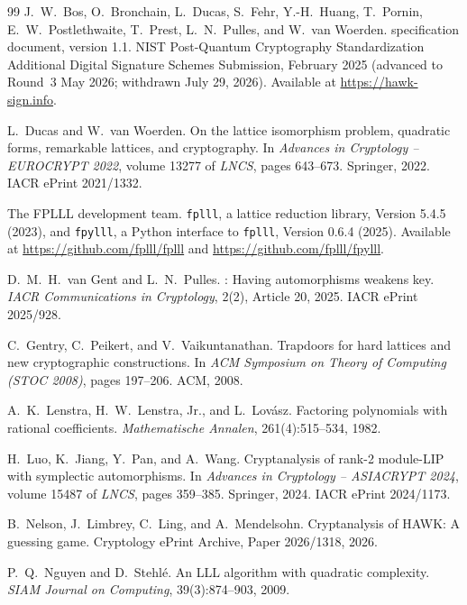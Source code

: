 \documentclass[11pt,a4paper]{article}
\theoremstyle{definition}
\begin{document}
\begin{thebibliography}{99}
J.~W.~Bos, O.~Bronchain, L.~Ducas, S.~Fehr, Y.-H.~Huang, T.~Pornin, E.~W.~Postlethwaite, T.~Prest, L.~N.~Pulles, and W.~van Woerden.
 specification document, version 1.1.
\newblock NIST Post-Quantum Cryptography Standardization Additional Digital Signature Schemes Submission, February 2025 (advanced to Round~3 May 2026; withdrawn July 29, 2026). Available at \url{https://hawk-sign.info}.

L.~Ducas and W.~van Woerden.
\newblock On the lattice isomorphism problem, quadratic forms, remarkable lattices, and cryptography.
\newblock In \emph{Advances in Cryptology -- EUROCRYPT 2022}, volume 13277 of \emph{LNCS}, pages 643--673. Springer, 2022. IACR ePrint 2021/1332.

The {FPLLL} development team.
\newblock \texttt{fplll}, a lattice reduction library, Version 5.4.5 (2023), and \texttt{fpylll}, a {Python} interface to \texttt{fplll}, Version 0.6.4 (2025).
\newblock Available at \url{https://github.com/fplll/fplll} and \url{https://github.com/fplll/fpylll}.

D.~M.~H.~van Gent and L.~N.~Pulles.
: Having automorphisms weakens key.
\newblock \emph{IACR Communications in Cryptology}, 2(2), Article 20, 2025. IACR ePrint 2025/928.

C.~Gentry, C.~Peikert, and V.~Vaikuntanathan.
\newblock Trapdoors for hard lattices and new cryptographic constructions.
\newblock In \emph{ACM Symposium on Theory of Computing (STOC 2008)}, pages 197--206. ACM, 2008.

A.~K.~Lenstra, H.~W.~Lenstra, Jr., and L.~Lov\'asz.
\newblock Factoring polynomials with rational coefficients.
\newblock \emph{Mathematische Annalen}, 261(4):515--534, 1982.

H.~Luo, K.~Jiang, Y.~Pan, and A.~Wang.
\newblock Cryptanalysis of rank-2 module-{LIP} with symplectic automorphisms.
\newblock In \emph{Advances in Cryptology -- ASIACRYPT 2024}, volume 15487 of \emph{LNCS}, pages 359--385. Springer, 2024. IACR ePrint 2024/1173.

B.~Nelson, J.~Limbrey, C.~Ling, and A.~Mendelsohn.
\newblock Cryptanalysis of {HAWK}: A guessing game.
\newblock Cryptology ePrint Archive, Paper 2026/1318, 2026.

P.~Q.~Nguyen and D.~Stehl\'e.
\newblock An {LLL} algorithm with quadratic complexity.
\newblock \emph{SIAM Journal on Computing}, 39(3):874--903, 2009.


\end{thebibliography}
\end{document}
